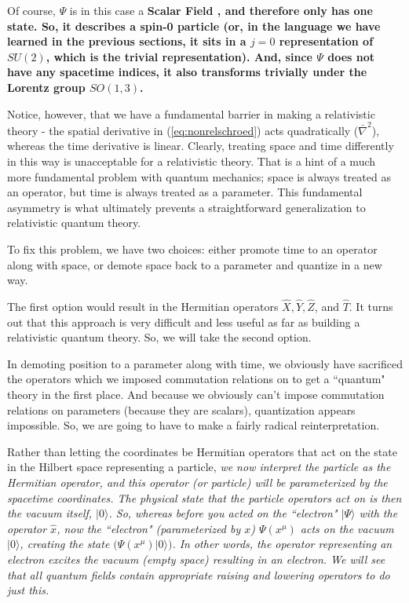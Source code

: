 \documentclass[12pt,epsf]{article}
\begin{document}
Of course, $\Psi$ is in this case a \bf Scalar Field \rm, and therefore only
has one state.	So, it describes a spin-0 particle (or, in the
language we have learned in the previous sections, it sits in a $j=0$
representation of $SU(2)$, which is the trivial representation).  And,
since $\Psi$ does not have any spacetime indices, it also transforms
trivially under the Lorentz group $SO(1,3)$.  

Notice, however, that we have a fundamental barrier in making a
relativistic theory - the spatial derivative in
(\ref{eq:nonrelschroed}) acts quadratically ($\bar \nabla^2$), whereas
the time derivative is linear.	Clearly, treating space and time
differently in this way is unacceptable for a relativistic theory. 
That is a hint of a much more fundamental problem with quantum
mechanics; space is always treated as an operator, but time is always
treated as a parameter.  This fundamental asymmetry is what ultimately
prevents a straightforward generalization to relativistic quantum
theory.  

To fix this problem, we have two choices: either promote time to an
operator along with space, or demote space back to a parameter and
quantize in a new way.	

The first option would result in the Hermitian operators $\hat X, \hat
Y, \hat Z$, and $\hat T$.  It turns out that this approach is very
difficult and less useful as far as building a relativistic quantum
theory.  So, we will take the second option.  

In demoting position to a parameter along with time, we obviously have
sacrificed the operators which we imposed commutation relations on to
get a ``quantum" theory in the first place.  And because we obviously
can't impose commutation relations on parameters (because they are
scalars), quantization appears impossible.  So, we are going to have to
make a fairly radical reinterpretation.  

Rather than letting the coordinates be Hermitian operators that act on
the state in the Hilbert space representing a particle, \it we now
interpret the particle as the Hermitian operator\rm, and \it this \rm
operator (or particle) will be parameterized by the spacetime
coordinates.  The physical state that the particle operators act on is
then the vacuum itself, $|0\rangle$.  So, whereas before you acted on
the ``electron" $|\Psi\rangle$ with the operator $\hat x$, now the
``electron" (parameterized by $x$) $\Psi(x^{\mu})$ acts on the vacuum
$|0\rangle$, creating the state $\big(\Psi(x^{\mu})|0\rangle\big)$.  In
other words, the operator representing an electron excites the vacuum
(empty space) resulting in an electron.  We will see that all quantum
fields contain appropriate raising and lowering operators to do just
this.  
\end{document}
